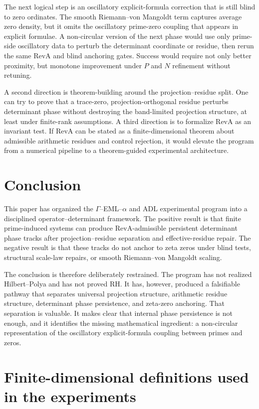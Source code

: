 \documentclass[11pt]{article}
\theoremstyle{definition}
\theoremstyle{plain}
\begin{document}
The next logical step is an oscillatory explicit-formula correction that is still blind to zero ordinates.  The smooth Riemann--von Mangoldt term captures average zero density, but it omits the oscillatory prime-zero coupling that appears in explicit formulae.  A non-circular version of the next phase would use only prime-side oscillatory data to perturb the determinant coordinate or residue, then rerun the same RevA and blind anchoring gates.  Success would require not only better proximity, but monotone improvement under $P$ and $N$ refinement without retuning.

A second direction is theorem-building around the projection--residue split.  One can try to prove that a trace-zero, projection-orthogonal residue perturbs determinant phase without destroying the band-limited projection structure, at least under finite-rank assumptions.  A third direction is to formalize RevA as an invariant test.  If RevA can be stated as a finite-dimensional theorem about admissible arithmetic residues and control rejection, it would elevate the program from a numerical pipeline to a theorem-guided experimental architecture.

\section{Conclusion}

This paper has organized the $\Gamma$--EML--$\alpha$ and ADL experimental program into a disciplined operator--determinant framework.  The positive result is that finite prime-induced systems can produce RevA-admissible persistent determinant phase tracks after projection--residue separation and effective-residue repair.  The negative result is that these tracks do not anchor to zeta zeros under blind tests, structural scale-law repairs, or smooth Riemann--von Mangoldt scaling.

The conclusion is therefore deliberately restrained.  The program has not realized Hilbert--Polya and has not proved RH.  It has, however, produced a falsifiable pathway that separates universal projection structure, arithmetic residue structure, determinant phase persistence, and zeta-zero anchoring.  That separation is valuable.  It makes clear that internal phase persistence is not enough, and it identifies the missing mathematical ingredient: a non-circular representation of the oscillatory explicit-formula coupling between primes and zeros.

\appendix

\section{Finite-dimensional definitions used in the experiments}
\end{document}
